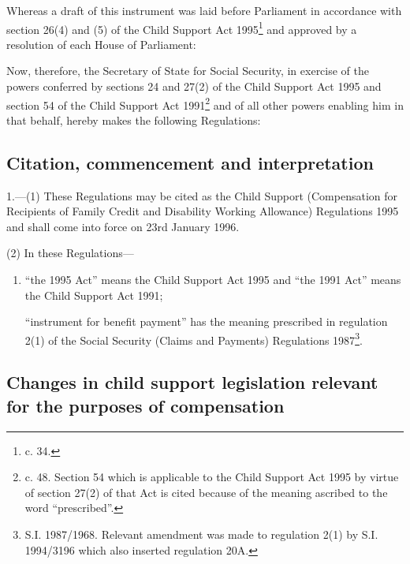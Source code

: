 \documentclass[12pt,a4paper]{article}
\title{\regstitle}
\author{S.I. 1995 No. 3263}
\date{Made 15th December 1995\\Coming into force 23rd January 1996
}
\begin{document}
\maketitle

\noindent
Whereas a draft of this instrument was laid before Parliament in accordance with section 26(4) and (5) of the Child Support Act 1995\footnote{ c. 34.} and approved by a resolution of each House of Parliament:

 Now, therefore, the Secretary of State for Social Security, in exercise of the powers conferred by sections 24 and 27(2) of the Child Support Act 1995 and section 54 of the Child Support Act 1991\footnote{ c. 48. Section 54 which is applicable to the Child Support Act 1995 by virtue of section 27(2) of that Act is cited because of the meaning ascribed to the word “prescribed”.} and of all other powers enabling him in that behalf, hereby makes the following Regulations:

{\sloppy

\tableofcontents

}

\setcounter{secnumdepth}{-2}

\subsection[1. Citation, commencement and interpretation]{Citation, commencement and interpretation}

1.—(1) These Regulations may be cited as the Child Support (Compensation for Recipients of Family Credit and Disability Working Allowance) Regulations 1995 and shall come into force on 23rd January 1996.

(2) In these Regulations—
\begin{enumerate}\item[]
“the 1995 Act” means the Child Support Act 1995 and “the 1991 Act” means the Child Support Act 1991;

“instrument for benefit payment” has the meaning prescribed in regulation 2(1) of the Social Security (Claims and Payments) Regulations 1987\footnote{\frenchspacing S.I. 1987/1968. Relevant amendment was made to regulation 2(1) by S.I. 1994/3196 which also inserted regulation 20A.}.
\end{enumerate}

\subsection[2. Changes in child support legislation relevant for the purposes of compensation]{Changes in child support legislation relevant for the purposes of compensation}
\end{document}
